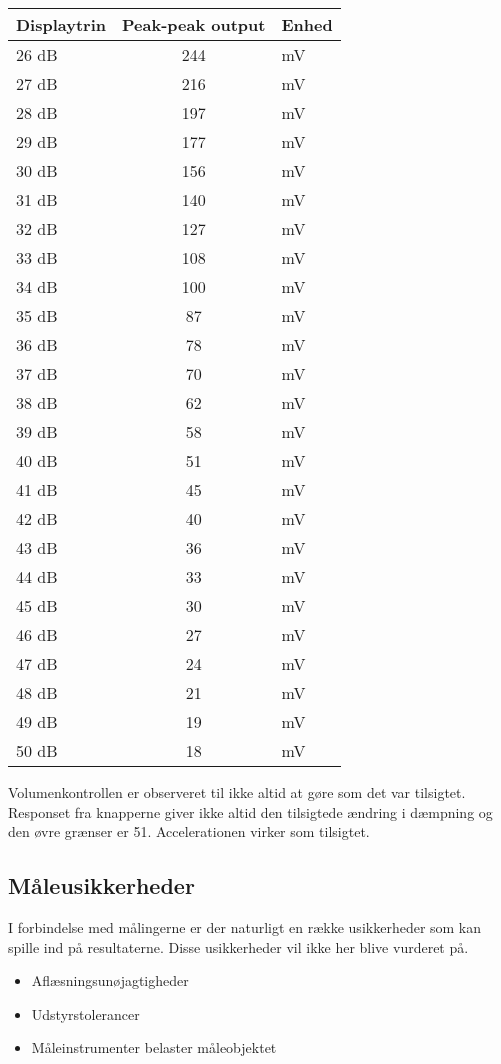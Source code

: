 \begin{table}[h]
\begin{minipage}[b]{0.5\linewidth}
\centering
\begin{tabular}{l|c|l}
\hline\hline
Displaytrin & Peak-peak output & Enhed \\
\hline\hline
26 dB & 244 & mV \\[4pt]
27 dB & 216 & mV \\[4pt]
28 dB & 197 & mV \\[4pt]
29 dB & 177 & mV \\[4pt]
30 dB & 156 & mV \\[4pt]
31 dB & 140 & mV \\[4pt]
32 dB & 127 & mV \\[4pt]
33 dB & 108 & mV \\[4pt]
34 dB & 100 & mV \\[4pt]
35 dB & 87 & mV \\[4pt]
36 dB & 78 & mV \\[4pt]
37 dB & 70 & mV \\[4pt]
38 dB & 62 & mV \\[4pt]
39 dB & 58 & mV \\[4pt]
40 dB & 51 & mV \\[4pt]
41 dB & 45 & mV \\[4pt]
42 dB & 40 & mV \\[4pt]
43 dB & 36 & mV \\[4pt]
44 dB & 33 & mV \\[4pt]
45 dB & 30 & mV \\[4pt]
46 dB & 27 & mV \\[4pt]
47 dB & 24 & mV \\[4pt]
48 dB & 21 & mV \\[4pt]
49 dB & 19 & mV \\[4pt]
50 dB & 18 & mV \\
\end{tabular}
\end{minipage}
\end{table}



Volumenkontrollen er observeret til ikke altid at gøre som det var tilsigtet. Responset fra knapperne giver ikke altid den tilsigtede ændring i dæmpning og den øvre grænser er 51. Accelerationen virker som tilsigtet.

\subsection*{Måleusikkerheder}
I forbindelse med målingerne er der naturligt en række usikkerheder som kan spille ind på resultaterne. Disse usikkerheder vil ikke her blive vurderet på. 

\begin{itemize}
\item Aflæsningsunøjagtigheder
\item Udstyrstolerancer
\item Måleinstrumenter belaster måleobjektet
\end{itemize}
